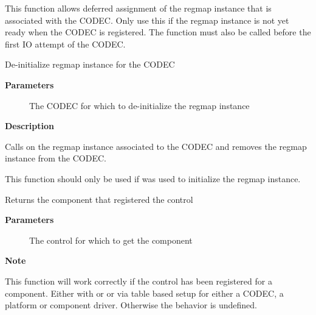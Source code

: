 \documentclass[a4paper,8pt,english]{sphinxmanual}
\begin{document}
This function allows deferred assignment of the regmap instance that is
associated with the CODEC. Only use this if the regmap instance is not yet
ready when the CODEC is registered. The function must also be called before
the first IO attempt of the CODEC.

\begin{fulllineitems}
\label{sound/kernel-api/alsa-driver-api:c.snd_soc_codec_exit_regmap}
De-initialize regmap instance for the CODEC

\end{fulllineitems}


\textbf{Parameters}
\begin{description}
\item[{}] \leavevmode
The CODEC for which to de-initialize the regmap instance

\end{description}

\textbf{Description}

Calls  on the regmap instance associated to the CODEC and
removes the regmap instance from the CODEC.

This function should only be used if {\hyperref[sound/kernel\string-api/alsa\string-driver\string-api:c.snd_soc_codec_init_regmap]{\emph{}}} was used to
initialize the regmap instance.

\begin{fulllineitems}
\label{sound/kernel-api/alsa-driver-api:c.snd_soc_kcontrol_component}
Returns the component that registered the control

\end{fulllineitems}


\textbf{Parameters}
\begin{description}
\item[{}] \leavevmode
The control for which to get the component

\end{description}

\textbf{Note}

This function will work correctly if the control has been registered
for a component. Either with {\hyperref[sound/kernel\string-api/alsa\string-driver\string-api:c.snd_soc_add_codec_controls]{\emph{}}} or
{\hyperref[sound/kernel\string-api/alsa\string-driver\string-api:c.snd_soc_add_platform_controls]{\emph{}}} or via  table based setup for either a
CODEC, a platform or component driver. Otherwise the behavior is undefined.
\end{document}
